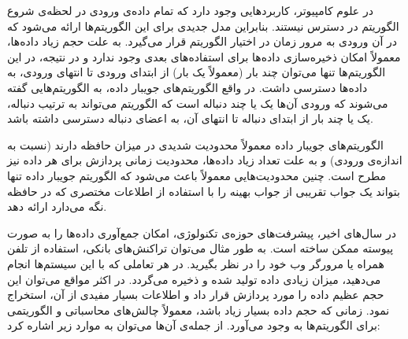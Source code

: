 
در علوم کامپیوتر، کاربردهایی وجود دارد که تمام داده‌ی ورودی در لحظه‌ی شروع الگوریتم در دسترس نیستند.
بنابراین مدل جدیدی برای این الگوریتم‌ها ارائه می‌شود که در آن ورودی به مرور زمان در اختیار الگوریتم قرار می‌گیرد.
به علت حجم زیاد داده‌ها، معمولاً امکان ذخیره‌سازی داده‌ها برای استفاده‌های بعدی وجود ندارد و در نتیجه، در این الگوریتم‌ها تنها می‌توان چند بار (معمولاً یک بار) از ابتدای ورودی تا انتهای ورودی، به داده‌ها دسترسی داشت.
در واقع الگوریتم‌های جویبار داده، به الگوریتم‌هایی گفته می‌شوند که ورودی آن‌ها یک یا چند دنباله است که الگوریتم می‌تواند به ترتیب دنباله، یک یا چند بار از ابتدای دنباله تا انتهای آن، به اعضای دنباله دسترسی داشته باشد.

الگوریتم‌های جویبار داده معمولاً محدودیت شدیدی در میزان حافظه دارند (نسبت به اندازه‌ی ورودی) و به علت تعداد زیاد داده‌ها، محدودیت زمانی پردازش برای هر داده نیز مطرح است. چنین محدودیت‌هایی معمولاً باعث می‌شود که الگوریتم جویبار داده تنها بتواند یک جواب تقریبی از جواب بهینه را با استفاده از اطلاعات مختصری که در حافظه نگه می‌دارد ارائه دهد.

در سال‌های اخیر، پیشرفت‌های حوزه‌ی تکنولوژی، امکان جمع‌آوری داده‌ها را به صورت پیوسته ممکن ساخته است.
به طور مثال می‌توان تراکنش‌های بانکی، استفاده از تلفن همراه یا مرورگر وب خود را در نظر بگیرید.
در هر تعاملی که با این سیستم‌ها انجام می‌دهید، میزان زیادی داده تولید شده و ذخیره می‌گردد.
در اکثر مواقع می‌توان این حجم عظیم داده را مورد پردازش قرار داد و اطلاعات بسیار مفیدی از آن، استخراج نمود.
زمانی که حجم داده بسیار زیاد باشد، معمولاً چالش‌های محاسباتی و الگوریتمی برای الگوریتم‌ها به وجود می‌آورد.
از جمله‌ی آن‌ها می‌توان به موارد زیر اشاره کرد:

 



